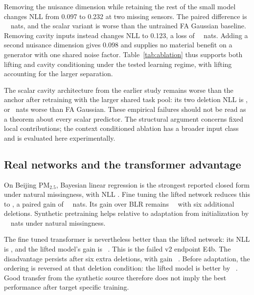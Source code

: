 

Removing the nuisance dimension while retaining the rest of the small model changes NLL from 0.097 to 0.232 at two missing sensors. The paired difference is \AblLiftabs\ \AblLiftci\ nats, and the scalar variant is worse than the untrained FA Gaussian baseline. Removing cavity inputs instead changes NLL to 0.123, a loss of \AblCavabs\ \AblCavci\ nats. Adding a second nuisance dimension gives 0.098 and supplies no material benefit on a generator with one shared noise factor. Table~\ref{tab:ablation} thus supports both lifting and cavity conditioning under the tested learning regime, with lifting accounting for the larger separation.

The scalar cavity architecture from the earlier study remains worse than the anchor after retraining with the larger shared task pool: its two deletion NLL is \Frepocavityfreshkc, or \Ablrepocavityfreshvsfaabs\ nats worse than FA Gaussian. These empirical failures should not be read as a theorem about every scalar predictor. The structural argument concerns fixed local contributions; the context conditioned ablation has a broader input class and is evaluated here experimentally.

\subsection{Real networks and the transformer advantage}
\label{sec:exp-real}



On Beijing PM$_{2.5}$, Bayesian linear regression is the strongest reported closed form under natural missingness, with NLL \RbeijingeZerovalblr. Fine tuning the lifted network reduces this to \RbeijingeZerovalftlift, a paired gain of \RbeijingeZerovsblr\ \RbeijingeZerovsblrci\ nats. Its gain over BLR remains \RbeijingeSixvsblr\ \RbeijingeSixvsblrci\ with six additional deletions. Synthetic pretraining helps relative to adaptation from initialization by \RbeijingeZerovsnopreabs\ \RbeijingeZerovsnopreci\ nats under natural missingness.

The fine tuned transformer is nevertheless better than the lifted network: its NLL is \RbeijingeZerovalftpfn, and the lifted model's gain is \RbeijingeZerovspfn\ \RbeijingeZerovspfnci. This is the failed v2 endpoint E4b. The disadvantage persists after six extra deletions, with gain \RbeijingeSixvspfn\ \RbeijingeSixvspfnci. Before adaptation, the ordering is reversed at that deletion condition: the lifted model is better by \RbeijingeSixzsliftvspfnabs\ \RbeijingeSixzsliftvspfnci. Good transfer from the synthetic source therefore does not imply the best performance after target specific training.

